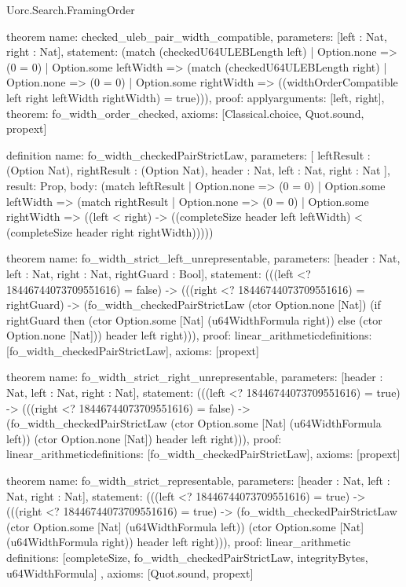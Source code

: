 \begin{lexlean}{Uorc.Search.FramingOrder}
\begin{semanticmodule}
theorem{
  name: checked_uleb_pair_width_compatible,
  parameters: [left : Nat, right : Nat],
  statement: (match (checkedU64ULEBLength left)
    | Option.none => (0 = 0)
    | Option.some leftWidth => (match (checkedU64ULEBLength right)
      | Option.none => (0 = 0)
      | Option.some rightWidth => ((widthOrderCompatible left right leftWidth rightWidth) = true))),
  proof: apply{arguments: [left, right], theorem: fo_width_order_checked},
  axioms: [Classical.choice, Quot.sound, propext]
}

definition{
  name: fo_width_checkedPairStrictLaw,
  parameters: [
    leftResult : (Option Nat),
    rightResult : (Option Nat),
    header : Nat,
    left : Nat,
    right : Nat
  ],
  result: Prop,
  body: (match leftResult
    | Option.none => (0 = 0)
    | Option.some leftWidth => (match rightResult
      | Option.none => (0 = 0)
      | Option.some rightWidth => ((left < right) -> ((completeSize header left leftWidth) < (completeSize header right rightWidth)))))
}

theorem{
  name: fo_width_strict_left_unrepresentable,
  parameters: [header : Nat, left : Nat, right : Nat, rightGuard : Bool],
  statement: (((left <? 18446744073709551616) = false) -> (((right <? 18446744073709551616) = rightGuard) -> (fo_width_checkedPairStrictLaw (ctor Option.none [Nat]) (if rightGuard then (ctor Option.some [Nat] (u64WidthFormula right)) else (ctor Option.none [Nat])) header left right))),
  proof: linear_arithmetic{definitions: [fo_width_checkedPairStrictLaw]},
  axioms: [propext]
}

theorem{
  name: fo_width_strict_right_unrepresentable,
  parameters: [header : Nat, left : Nat, right : Nat],
  statement: (((left <? 18446744073709551616) = true) -> (((right <? 18446744073709551616) = false) -> (fo_width_checkedPairStrictLaw (ctor Option.some [Nat] (u64WidthFormula left)) (ctor Option.none [Nat]) header left right))),
  proof: linear_arithmetic{definitions: [fo_width_checkedPairStrictLaw]},
  axioms: [propext]
}

theorem{
  name: fo_width_strict_representable,
  parameters: [header : Nat, left : Nat, right : Nat],
  statement: (((left <? 18446744073709551616) = true) -> (((right <? 18446744073709551616) = true) -> (fo_width_checkedPairStrictLaw (ctor Option.some [Nat] (u64WidthFormula left)) (ctor Option.some [Nat] (u64WidthFormula right)) header left right))),
  proof: linear_arithmetic{
    definitions: [completeSize, fo_width_checkedPairStrictLaw, integrityBytes, u64WidthFormula]
  },
  axioms: [Quot.sound, propext]
}


\end{semanticmodule}
\end{lexlean}
